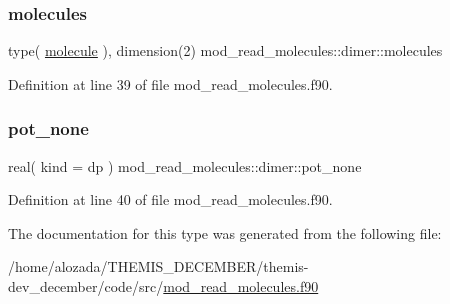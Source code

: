 \subsubsection{\texorpdfstring{molecules}{molecules}}
{\footnotesize\ttfamily type( \hyperlink{structmod__read__molecules_1_1molecule}{molecule} ), dimension(2) mod\+\_\+read\+\_\+molecules\+::dimer\+::molecules}



Definition at line 39 of file mod\+\_\+read\+\_\+molecules.\+f90.

\mbox{\label{structmod__read__molecules_1_1dimer_aa70cdc483b2f8c3c9b505d32c5915fd2}} 
\subsubsection{\texorpdfstring{pot\+\_\+none}{pot\_none}}
{\footnotesize\ttfamily real( kind = dp ) mod\+\_\+read\+\_\+molecules\+::dimer\+::pot\+\_\+none}



Definition at line 40 of file mod\+\_\+read\+\_\+molecules.\+f90.



The documentation for this type was generated from the following file\+:\begin{DoxyCompactItemize}
\item 
/home/alozada/\+T\+H\+E\+M\+I\+S\+\_\+\+D\+E\+C\+E\+M\+B\+E\+R/themis-\/dev\+\_\+december/code/src/\hyperlink{mod__read__molecules_8f90}{mod\+\_\+read\+\_\+molecules.\+f90}\end{DoxyCompactItemize}
